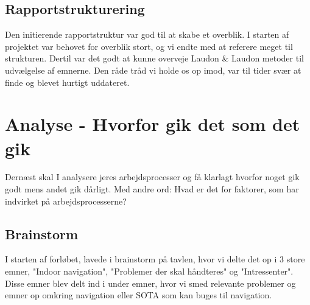 \documentclass[a4paper,12pt,twoside,openright]{memoir}
\begin{document}
        \subsection{Rapportstrukturering}

        Den initierende rapportstruktur var god til at skabe et overblik. I starten af projektet var behovet for overblik stort, og vi endte med at referere meget til strukturen. Dertil var det godt at kunne overveje Laudon \& Laudon metoder til udvælgelse af emnerne. Den råde tråd vi holde os op imod, var til tider svær at finde og blevet hurtigt uddateret.



    

    \section{Analyse - Hvorfor gik det som det gik}
    Dernæst skal I analysere jeres arbejdsprocesser og få klarlagt hvorfor noget gik godt mens andet gik dårligt. Med andre ord: Hvad er det for faktorer, som har indvirket på arbejdsprocesserne? 

    

        \subsection{Brainstorm}
        I starten af forløbet, lavede i brainstorm på tavlen, hvor vi delte det op i 3 store  emner, "Indoor navigation", "Problemer der skal håndteres" og "Intressenter". Disse emner blev delt ind i under emner, hvor vi smed relevante problemer og emner op omkring navigation eller SOTA som kan buges til navigation. 
\end{document}
